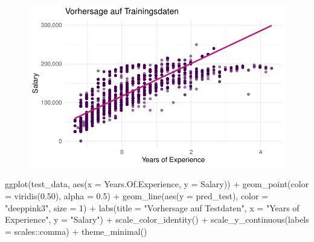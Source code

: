 \documentclass[
  letterpaper,
  DIV=11,
  numbers=noendperiod]{scrartcl}
\newenvironment{Shaded}{\begin{snugshade}}{\end{snugshade}}
\newcommand{\AttributeTok}[1]{\textcolor[rgb]{0.40,0.45,0.13}{#1}}
\newcommand{\DecValTok}[1]{\textcolor[rgb]{0.68,0.00,0.00}{#1}}
\newcommand{\FloatTok}[1]{\textcolor[rgb]{0.68,0.00,0.00}{#1}}
\newcommand{\FunctionTok}[1]{\textcolor[rgb]{0.28,0.35,0.67}{#1}}
\newcommand{\NormalTok}[1]{\textcolor[rgb]{0.00,0.23,0.31}{#1}}
\newcommand{\SpecialCharTok}[1]{\textcolor[rgb]{0.37,0.37,0.37}{#1}}
\newcommand{\StringTok}[1]{\textcolor[rgb]{0.13,0.47,0.30}{#1}}
\begin{document}
\begin{figure}[H]

{\centering \includegraphics{main_doc_files/figure-pdf/unnamed-chunk-112-1.pdf}

}

\end{figure}

\begin{Shaded}
\begin{Highlighting}[]
\FunctionTok{ggplot}\NormalTok{(test\_data, }\FunctionTok{aes}\NormalTok{(}\AttributeTok{x =}\NormalTok{ Years.Of.Experience, }\AttributeTok{y =}\NormalTok{ Salary)) }\SpecialCharTok{+}
  \FunctionTok{geom\_point}\NormalTok{(}\AttributeTok{color =} \FunctionTok{viridis}\NormalTok{(}\FloatTok{0.50}\NormalTok{), }\AttributeTok{alpha =} \FloatTok{0.5}\NormalTok{) }\SpecialCharTok{+}
  \FunctionTok{geom\_line}\NormalTok{(}\FunctionTok{aes}\NormalTok{(}\AttributeTok{y =}\NormalTok{ pred\_test), }\AttributeTok{color =} \StringTok{"deeppink3"}\NormalTok{, }\AttributeTok{size =} \DecValTok{1}\NormalTok{) }\SpecialCharTok{+}
  \FunctionTok{labs}\NormalTok{(}\AttributeTok{title =} \StringTok{"Vorhersage auf Testdaten"}\NormalTok{,}
       \AttributeTok{x =} \StringTok{"Years of Experience"}\NormalTok{,}
       \AttributeTok{y =} \StringTok{"Salary"}\NormalTok{) }\SpecialCharTok{+}
  \FunctionTok{scale\_color\_identity}\NormalTok{() }\SpecialCharTok{+}
  \FunctionTok{scale\_y\_continuous}\NormalTok{(}\AttributeTok{labels =}\NormalTok{ scales}\SpecialCharTok{::}\NormalTok{comma) }\SpecialCharTok{+}
  \FunctionTok{theme\_minimal}\NormalTok{()}
\end{Highlighting}
\end{Shaded}
\end{document}
